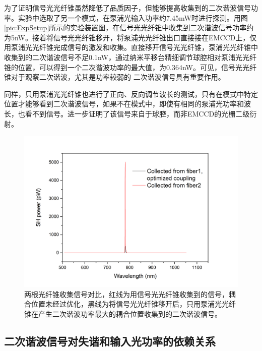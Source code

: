 \documentclass[UTF8,a4paper,cs4size,hyperref]{ctexart}
\begin{document}
为了证明信号光光纤锥虽然降低了品质因子，但能够提高收集到的二次谐波信号功率。实验中选取了另一个模式，在泵浦光输入功率约7.45mW时进行探测。用图\ref{pic:ExpSetup}所示的实验装置图，在信号光光纤锥中收集到二次谐波信号功率约为5nW。接着将信号光光纤锥移开，将泵浦光光纤锥出口直接接在EMCCD上，仅用泵浦光光纤锥完成信号的激发和收集。直接移开信号光光纤锥，泵浦光光纤锥中收集到的二次谐波信号不足0.1nW，通过纳米平移台精细调节球腔相对泵浦光光纤锥的位置，可以得到一个二次谐波功率的最大值，为0.364nW。可见，信号光光纤锥对于观察二次谐波，尤其是功率较弱的 二次谐波信号具有重要作用。

同样，只用泵浦光光纤锥也进行了正向、反向调节波长的测试，只有在模式中特定位置才能够看到二次谐波信号，如果不在模式中，即使有相同的泵浦光功率和波长，也看不到信号。进一步证明了该信号来自于球腔，而非EMCCD的光栅二级衍射。

\begin{figure}
\centering
\includegraphics[width=14cm ]{Figf1_f2}
\caption{两根光纤锥收集信号对比，红线为用信号光光纤锥收集到的信号，耦合位置未经过优化，黑线为将信号光光纤锥移开后，只用泵浦光光纤锥在产生二次谐波功率最大的耦合位置收集到的二次谐波信号。}
\label{pic:Figf1_f2}
\end{figure}

\subsection{二次谐波信号对失谐和输入光功率的依赖关系}

\end{document}
